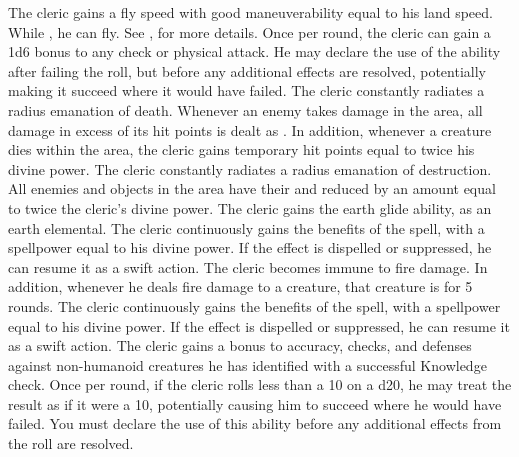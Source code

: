             The cleric gains a fly speed with good maneuverability equal to his land speed.
            While \unencumbered, he can fly.
            See , for more details.
            Once per round, the cleric can gain a \plus1d6 bonus to any check or physical attack.
            He may declare the use of the ability after failing the roll, but before any additional effects are resolved, potentially making it succeed where it would have failed.
            The cleric constantly radiates a \arealarge radius emanation of death.
            Whenever an enemy takes damage in the area, all damage in excess of its hit points is dealt as .
            In addition, whenever a creature dies within the area, the cleric gains temporary hit points equal to twice his divine power.
            The cleric constantly radiates a \arealarge radius emanation of destruction.
            All enemies and objects in the area have their  and  reduced by an amount equal to twice the cleric's divine power.
            The cleric gains the earth glide ability, as an earth elemental.
             The cleric continuously gains the benefits of the 
            spell, with a spellpower equal to his divine power.
            If the effect is dispelled or suppressed, he can resume it as a swift action.
            The cleric becomes immune to fire damage.
            In addition, whenever he deals fire damage to a creature, that creature is \ignited for 5 rounds.
             The cleric continuously gains the benefits of the 
            spell, with a spellpower equal to his divine power.
            If the effect is dispelled or suppressed, he can resume it as a swift action.
            The cleric gains a  bonus to accuracy, checks, and defenses against non-humanoid creatures he has identified with a successful Knowledge check.
            Once per round, if the cleric rolls less than a 10 on a d20, he may treat the result as if it were a 10, potentially causing him to succeed where he would have failed.
            You must declare the use of this ability before any additional effects from the roll are resolved.
